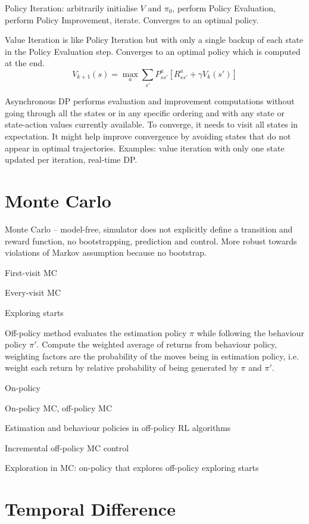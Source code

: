 \documentclass[twocolumn]{article}
\begin{document}
Policy Iteration: arbitrarily initialise $V$ and $\pi_0$, perform Policy Evaluation, perform Policy Improvement, iterate. Converges to an optimal policy.

Value Iteration is like Policy Iteration but with only a single backup of each state in the Policy Evaluation step. Converges to an optimal policy which is computed at the end.
\[
V_{k+1}(s)=\max_a \sum_{s'} P^a_{ss'}[R^a_{ss'}+\gamma V_k(s')]
\]

Asynchronous DP performs evaluation and improvement computations without going through all the states or in any specific ordering and with any state or state-action values currently available. To converge, it needs to visit all states in expectation. It might help improve convergence by avoiding states that do not appear in optimal trajectories. Examples: value iteration with only one state updated per iteration, real-time DP.

\section{Monte Carlo}

Monte Carlo -- model-free, simulator does not explicitly define a transition and reward function, no bootstrapping, prediction and control. More robust towards violations of Markov assumption because no bootstrap.

First-visit MC

Every-visit MC

Exploring starts

Off-policy method evaluates the estimation policy $\pi$ while following the behaviour policy $\pi'$.
Compute the weighted average of returns from behaviour policy, weighting factors are the probability of the moves being in estimation policy, i.e. weight each return by relative probability of being generated by $\pi$ and $\pi'$.





On-policy

On-policy MC, off-policy MC

Estimation and behaviour policies in off-policy RL algorithms

Incremental off-policy MC control

Exploration in MC:
on-policy that explores
off-policy
exploring starts

\section{Temporal Difference}
\end{document}
